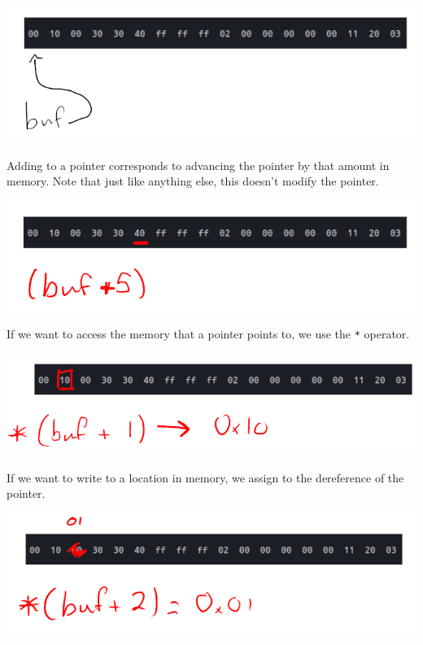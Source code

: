 \documentclass[11pt]{article}
\begin{document}
\begin{center}
\includegraphics[width=.9\linewidth]{./imgs/buf2.png}
\end{center}

Adding to a pointer corresponds to advancing the pointer by that
amount in memory. Note that just like anything else, this doesn't
modify the pointer.

\begin{center}
\includegraphics[width=.9\linewidth]{./imgs/bufadd.png}
\end{center}

If we want to access the memory that a pointer points to, we use
the \texttt{*} operator.

\begin{center}
\includegraphics[width=.9\linewidth]{./imgs/bufstar.png}
\end{center}

If we want to write to a location in memory, we assign to the
dereference of the pointer.

\begin{center}
\includegraphics[width=.9\linewidth]{./imgs/bufassign.png}
\end{center}
\end{document}
